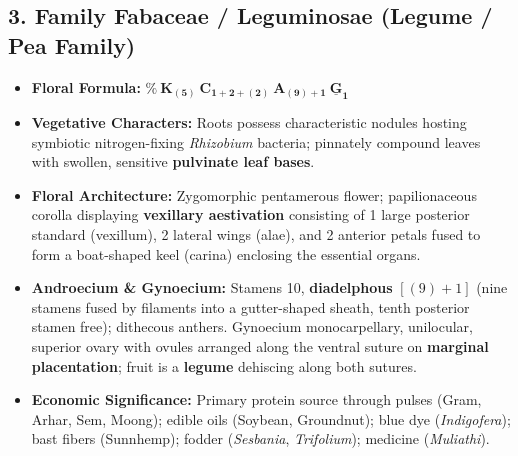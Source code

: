 \documentclass[10pt,twoside,openright]{book}
\begin{document}
\subsection{3. Family Fabaceae / Leguminosae (Legume / Pea Family)}
\begin{itemize}
  \item \textbf{Floral Formula:} $\mathbf{\%\:\text{K}_{(5)}\:\text{C}_{1+2+(2)}\:\text{A}_{(9)+1}\:\underline{\text{G}}_1}$
  \item \textbf{Vegetative Characters:} Roots possess characteristic nodules hosting symbiotic nitrogen-fixing \textit{Rhizobium} bacteria; pinnately compound leaves with swollen, sensitive \textbf{pulvinate leaf bases}.
  \item \textbf{Floral Architecture:} Zygomorphic pentamerous flower; papilionaceous corolla displaying \textbf{vexillary aestivation} consisting of 1 large posterior standard (vexillum), 2 lateral wings (alae), and 2 anterior petals fused to form a boat-shaped keel (carina) enclosing the essential organs.
  \item \textbf{Androecium \& Gynoecium:} Stamens 10, \textbf{diadelphous} $[(9) + 1]$ (nine stamens fused by filaments into a gutter-shaped sheath, tenth posterior stamen free); dithecous anthers. Gynoecium monocarpellary, unilocular, superior ovary with ovules arranged along the ventral suture on \textbf{marginal placentation}; fruit is a \textbf{legume} dehiscing along both sutures.
  \item \textbf{Economic Significance:} Primary protein source through pulses (Gram, Arhar, Sem, Moong); edible oils (Soybean, Groundnut); blue dye (\textit{Indigofera}); bast fibers (Sunnhemp); fodder (\textit{Sesbania}, \textit{Trifolium}); medicine (\textit{Muliathi}).
\end{itemize}
\end{document}
